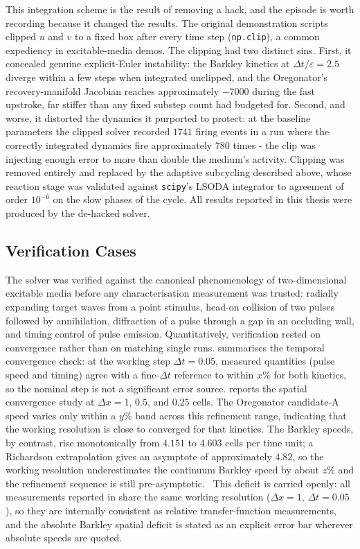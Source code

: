 This integration scheme is the result of removing a hack, and the episode is worth recording because it changed the results. 
The original demonstration scripts clipped $u$ and $v$ to a fixed box after every time step (\texttt{np.clip}), a common expediency in excitable-media demos. 
The clipping had two distinct sins. First, it concealed genuine explicit-Euler instability: the Barkley kinetics at $\Delta t/\varepsilon = 2.5$ diverge within a few steps when integrated unclipped, and the Oregonator's recovery-manifold Jacobian reaches approximately $-7000$ during the fast upstroke, far stiffer than any fixed substep count had budgeted for. 
Second, and worse, it distorted the dynamics it purported to protect: at the baseline parameters the clipped solver recorded $1741$ firing events in a run where the correctly integrated dynamics fire approximately $780$ times - the clip was injecting enough error to more than double the medium's activity. 
Clipping was removed entirely and replaced by the adaptive subcycling described above, whose reaction stage was validated against \texttt{scipy}'s LSODA integrator to agreement of order $10^{-6}$ on the slow phases of the cycle. 
All results reported in this thesis were produced by the de-hacked solver.

\subsection{Verification Cases}
\label{sec:meth_verification}

The solver was verified against the canonical phenomenology of two-dimensional excitable media before any characterisation measurement was trusted: radially expanding target waves from a point stimulus, head-on collision of two pulses followed by annihilation, diffraction of a pulse through a gap in an occluding wall, and timing control of pulse emission. 
Quantitatively, verification rested on convergence rather than on matching single runs. 
 summarises the temporal convergence check: at the working step $\Delta t = 0.05$, measured quantities (pulse speed and timing) agree with a fine-$\Delta t$ reference to within $x\%$ for both kinetics, so the nominal step is not a significant error source. 
 reports the spatial convergence study at $\Delta x = 1$, $0.5$, and $0.25$ cells. The Oregonator candidate-A speed varies only within a $y\%$ band across this refinement range, indicating that the working resolution is close to converged for that kinetics. 
The Barkley speeds, by contrast, rise monotonically from $4.151$ to $4.603$ cells per time unit; a Richardson extrapolation gives an asymptote of approximately $4.82$, so the working resolution underestimates the continuum Barkley speed by about $z\%$ and the refinement sequence is still pre-asymptotic. \
This deficit is carried openly: all measurements reported in  share the same working resolution ($\Delta x = 1$, $\Delta t = 0.05$), so they are internally consistent as relative transfer-function measurements, and the absolute Barkley spatial deficit is stated as an explicit error bar wherever absolute speeds are quoted.

